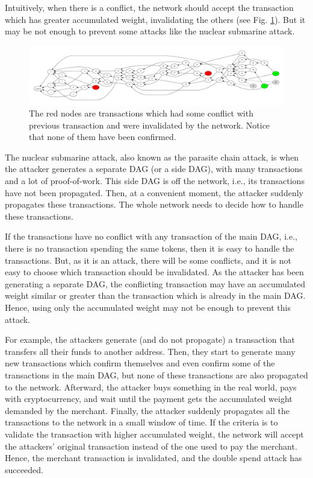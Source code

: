 Intuitively, when there is a conflict, the network should accept the transaction which has greater accumulated weight, invalidating the others (see Fig. \ref{fig-tangle-conflict}). But it may be not enough to prevent some attacks like the nuclear submarine attack.

\begin{figure}[ht]
\centering\includegraphics[width=\textwidth]{./images01/fig-tangle-conflict.pdf}
\caption{The red nodes are transactions which had some conflict with previous transaction and were invalidated by the network. Notice that none of them have been confirmed.\label{fig-tangle-conflict}}
\end{figure}

The nuclear submarine attack, also known as the parasite chain attack, is when the attacker generates a separate DAG (or a side DAG), with many transactions and a lot of proof-of-work. This side DAG is off the network, i.e., its transactions have not been propagated. Then, at a convenient moment, the attacker suddenly propagates these transactions. The whole network needs to decide how to handle these transactions.

If the transactions have no conflict with any transaction of the main DAG, i.e., there is no transaction spending the same tokens, then it is easy to handle the transactions. But, as it is an attack, there will be some conflicts, and it is not easy to choose which transaction should be invalidated. As the attacker has been generating a separate DAG, the conflicting transaction may have an accumulated weight similar or greater than the transaction which is already in the main DAG. Hence, using only the accumulated weight may not be enough to prevent this attack.

For example, the attackers generate (and do not propagate) a transaction that transfers all their funds to another address. Then, they start to generate many new transactions which confirm themselves and even confirm some of the transactions in the main DAG, but none of these transactions are also propagated to the network. Afterward, the attacker buys something in the real world, pays with cryptocurrency, and wait until the payment gets the accumulated weight demanded by the merchant. Finally, the attacker suddenly propagates all the transactions to the network in a small window of time. If the criteria is to validate the transaction with higher accumulated weight, the network will accept the attackers' original transaction instead of the one used to pay the merchant. Hence, the merchant transaction is invalidated, and the double spend attack has succeeded.

